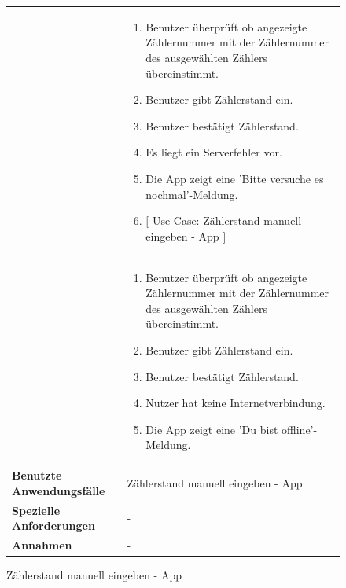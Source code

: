 
\begin{figure}[h]
	\centering
	\begin{tabularx}{\textwidth}{ X | X }
	&
		\begin{enumerate}
			\item Benutzer überprüft ob angezeigte Zählernummer mit der Zählernummer des ausgewählten Zählers übereinstimmt.
			\item Benutzer gibt Zählerstand ein.
			\item Benutzer bestätigt Zählerstand.
			\item Es liegt ein Serverfehler vor.
			\item Die App zeigt eine 'Bitte versuche es nochmal'-Meldung. 
			\item $\lbrack$ Use-Case: Zählerstand manuell eingeben - App $\rbrack$
		\end{enumerate} \\  &
		\begin{enumerate}
			\item Benutzer überprüft ob angezeigte Zählernummer mit der Zählernummer des ausgewählten Zählers übereinstimmt.
			\item Benutzer gibt Zählerstand ein.
			\item Benutzer bestätigt Zählerstand.
			\item Nutzer hat keine Internetverbindung.
			\item Die App zeigt eine 'Du bist offline'-Meldung.
		\end{enumerate}  \\ \hline
		\textbf{Benutzte Anwendungsfälle} & Zählerstand manuell eingeben - App \\ \hline
		\textbf{Spezielle Anforderungen} & - \\ \hline
		\textbf{Annahmen} & -
	\end{tabularx}
	\caption{Zählerstand manuell eingeben - App}
	\label{fig:anwendungsfall-server-tabelle-xx-1}
\end{figure}

\newpage

